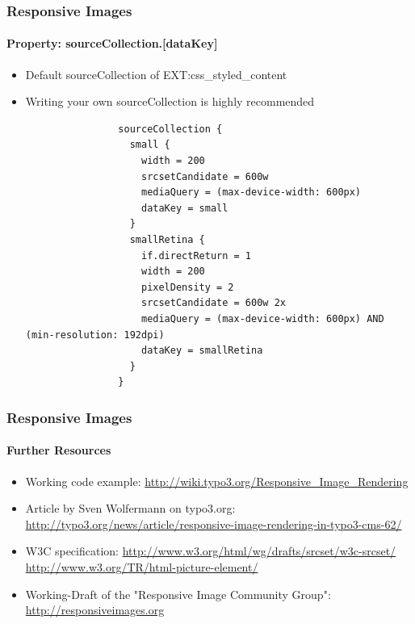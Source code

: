 
\begin{frame}[fragile]
	\frametitle{Responsive Images}
	\framesubtitle{Property: sourceCollection.[dataKey]}

	\begin{itemize}
		\item Default sourceCollection of EXT:css\_styled\_content
		\item Writing your own sourceCollection is highly recommended

			\lstset{
				basicstyle=\tiny\ttfamily
			}

			\begin{lstlisting}
				sourceCollection {
				  small {
				    width = 200
				    srcsetCandidate = 600w
				    mediaQuery = (max-device-width: 600px)
				    dataKey = small
				  }
				  smallRetina {
				    if.directReturn = 1
				    width = 200
				    pixelDensity = 2
				    srcsetCandidate = 600w 2x
				    mediaQuery = (max-device-width: 600px) AND (min-resolution: 192dpi)
				    dataKey = smallRetina
				  }
				}
			\end{lstlisting}
	\end{itemize}

\end{frame}


\begin{frame}[fragile]
	\frametitle{Responsive Images}
	\framesubtitle{Further Resources}

	\begin{itemize}
		\item Working code example:\newline
			\small\url{http://wiki.typo3.org/Responsive_Image_Rendering}\normalsize

		\item Article by Sven Wolfermann on typo3.org:\newline
			\small\url{http://typo3.org/news/article/responsive-image-rendering-in-typo3-cms-62/}\normalsize

		\item W3C specification:\newline
			\small\url{http://www.w3.org/html/wg/drafts/srcset/w3c-srcset/}\newline
			\small\url{http://www.w3.org/TR/html-picture-element/}

		\item Working-Draft of the "Responsive Image Community Group":\newline
			\small\url{http://responsiveimages.org}\normalsize

	\end{itemize}

\end{frame}


